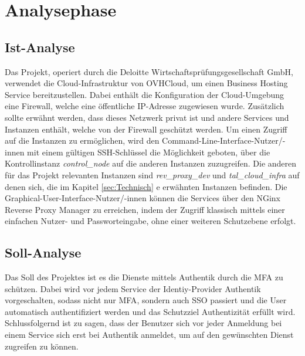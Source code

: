 \section{Analysephase} 
\label{sec:Analysephase}


\subsection{Ist-Analyse} 
\label{sec:IstAnalyse}
Das Projekt, operiert durch die Deloitte Wirtschaftsprüfungsgesellschaft GmbH, verwendet die Cloud-Infrastruktur 
von OVHCloud, um einen Business Hosting Service bereitzustellen. Dabei enthält die Konfiguration der 
Cloud-Umgebung eine Firewall, welche eine öffentliche IP-Adresse zugewiesen wurde. Zusätzlich sollte erwähnt werden, 
dass dieses Netzwerk privat ist und andere Services und Instanzen enthält, welche von der Firewall geschützt werden.
Um einen Zugriff auf die Instanzen zu ermöglichen, wird den Command-Line-Interface-Nutzer/-innen mit einem gültigen
SSH-Schlüssel die Möglichkeit geboten, über die Kontrollinstanz \textit{control\_node} auf die anderen Instanzen 
zuzugreifen. Die anderen für das Projekt relevanten Instanzen sind \textit{rev\_proxy\_dev} und \textit{tal\_cloud\_infra} 
auf denen sich, die im Kapitel \ref*{sec:Technisch} e  
erwähnten Instanzen befinden. Die Graphical-User-Interface-Nutzer/-innen können die Services über den NGinx Reverse Proxy Manager 
zu erreichen, indem der Zugriff klassisch mittels einer einfachen Nutzer- und Passworteingabe, ohne einer weiteren 
Schutzebene erfolgt.

\subsection{Soll-Analyse}
\label{sec:SollAnalyse}
Das Soll des Projektes ist es die Dienste mittels Authentik durch die \acs{MFA} zu schützen. Dabei wird vor jedem Service 
der Identiy-Provider Authentik vorgeschalten, sodass nicht nur \acs{MFA}, sondern auch \acs{SSO} passiert und die User automatisch 
authentifiziert werden und das Schutzziel Authentizität erfüllt wird.
\\Schlussfolgernd ist zu sagen, dass der Benutzer sich vor jeder Anmeldung bei einem Service sich erst bei Authentik 
anmeldet, um auf den gewünschten Dienst zugreifen zu können.



